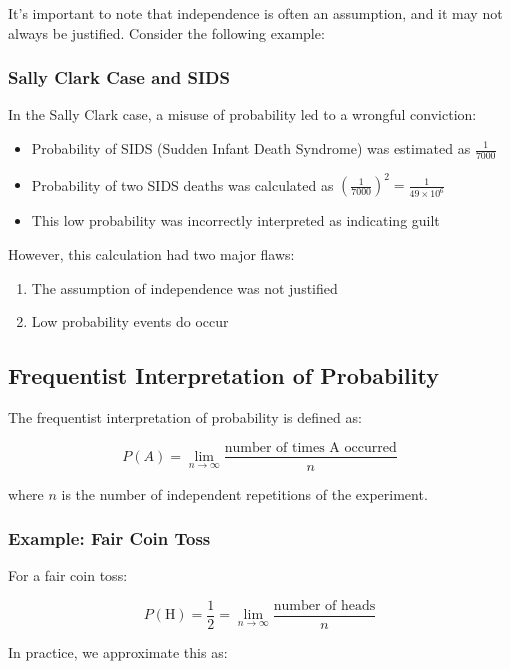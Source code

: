 \documentclass{article}
\begin{document}
    It's important to note that independence is often an assumption, and it may not always be justified. Consider the following example:

    \subsubsection*{Sally Clark Case and SIDS}

    In the Sally Clark case, a misuse of probability led to a wrongful conviction:

    \begin{itemize}
        \item Probability of SIDS (Sudden Infant Death Syndrome) was estimated as $\frac{1}{7000}$
        \item Probability of two SIDS deaths was calculated as $(\frac{1}{7000})^2 = \frac{1}{49 \times 10^6}$
        \item This low probability was incorrectly interpreted as indicating guilt
    \end{itemize}

    However, this calculation had two major flaws:
    \begin{enumerate}
        \item The assumption of independence was not justified
        \item Low probability events do occur
    \end{enumerate}

    \subsection*{Frequentist Interpretation of Probability}

    The frequentist interpretation of probability is defined as:

    \[
    P(A) = \lim_{n \to \infty} \frac{\text{number of times A occurred}}{n}
    \]

    where $n$ is the number of independent repetitions of the experiment.

    \subsubsection*{Example: Fair Coin Toss}

    For a fair coin toss:

    \[
    P(\text{H}) = \frac{1}{2} = \lim_{n \to \infty} \frac{\text{number of heads}}{n}
    \]

    In practice, we approximate this as:
\end{document}
